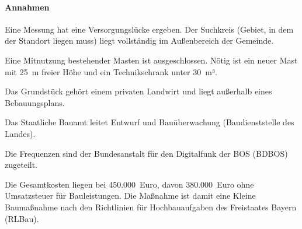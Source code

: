\paragraph{Annahmen}
\begin{description}[leftmargin=1.0cm,style=sameline]
  \item[A1] Eine Messung hat eine Versorgungslücke ergeben. Der Suchkreis (Gebiet, in dem der Standort liegen muss) liegt vollständig im Außenbereich der Gemeinde.
  \item[A2] Eine Mitnutzung bestehender Masten ist ausgeschlossen. Nötig ist ein neuer Mast mit 25~m freier Höhe und ein Technikschrank unter 30~m³.
  \item[A3] Das Grundstück gehört einem privaten Landwirt und liegt außerhalb eines Bebauungsplans.
  \item[A4] Das Staatliche Bauamt leitet Entwurf und Bauüberwachung (Baudienststelle des Landes).
  \item[A5] Die Frequenzen sind der Bundesanstalt für den Digitalfunk der BOS (BDBOS) zugeteilt. 
  \item[A6] 
  \item[A7] Die Gesamtkosten liegen bei 450.000~Euro, davon 380.000~Euro ohne Umsatzsteuer für Bauleistungen. Die Maßnahme ist damit eine Kleine Baumaßnahme nach den Richtlinien für Hochbauaufgaben des Freistaates Bayern (RLBau).
\end{description}
